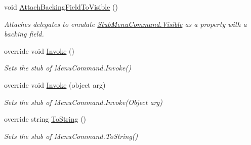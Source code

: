 \begin{DoxyCompactItemize}
void \hyperlink{class_system_1_1_component_model_1_1_design_1_1_fakes_1_1_stub_menu_command_a15a7736df48e2ccf48d9bf04371caae4}{Attach\-Backing\-Field\-To\-Visible} ()
\begin{DoxyCompactList}\small\item\em Attaches delegates to emulate \hyperlink{class_system_1_1_component_model_1_1_design_1_1_fakes_1_1_stub_menu_command_a36a2ed3d62ef5e784163ab8448fe75e2}{Stub\-Menu\-Command.\-Visible} as a property with a backing field.\end{DoxyCompactList}\item 
override void \hyperlink{class_system_1_1_component_model_1_1_design_1_1_fakes_1_1_stub_menu_command_a2029c477825d6aef2e6da08c0c54f94c}{Invoke} ()
\begin{DoxyCompactList}\small\item\em Sets the stub of Menu\-Command.\-Invoke()\end{DoxyCompactList}\item 
override void \hyperlink{class_system_1_1_component_model_1_1_design_1_1_fakes_1_1_stub_menu_command_a82dfbf010956594c499dce6f35981a99}{Invoke} (object arg)
\begin{DoxyCompactList}\small\item\em Sets the stub of Menu\-Command.\-Invoke(\-Object arg)\end{DoxyCompactList}\item 
override string \hyperlink{class_system_1_1_component_model_1_1_design_1_1_fakes_1_1_stub_menu_command_a11084a76a09be9ed40202203f8714e89}{To\-String} ()
\begin{DoxyCompactList}\small\item\em Sets the stub of Menu\-Command.\-To\-String()\end{DoxyCompactList}\end{DoxyCompactItemize}
